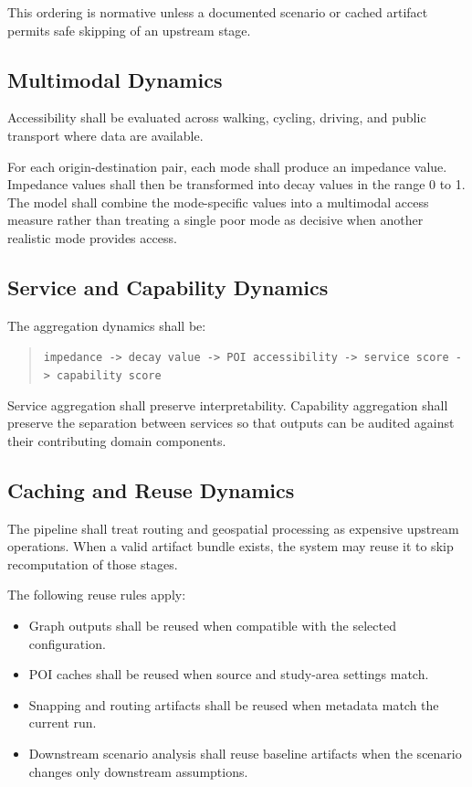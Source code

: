 \documentclass[11pt]{article}
\begin{document}
This ordering is normative unless a documented scenario or cached artifact permits safe skipping of an upstream stage.

\subsection*{Multimodal Dynamics}

Accessibility shall be evaluated across walking, cycling, driving, and public transport where data are available.

For each origin-destination pair, each mode shall produce an impedance value. Impedance values shall then be transformed into decay values in the range 0 to 1. The model shall combine the mode-specific values into a multimodal access measure rather than treating a single poor mode as decisive when another realistic mode provides access.

\subsection*{Service and Capability Dynamics}

The aggregation dynamics shall be:

\begin{quote}
\texttt{impedance -> decay value -> POI accessibility -> service score -> capability score}
\end{quote}

Service aggregation shall preserve interpretability. Capability aggregation shall preserve the separation between services so that outputs can be audited against their contributing domain components.

\subsection*{Caching and Reuse Dynamics}

The pipeline shall treat routing and geospatial processing as expensive upstream operations. When a valid artifact bundle exists, the system may reuse it to skip recomputation of those stages.

The following reuse rules apply:

\begin{itemize}
  \item Graph outputs shall be reused when compatible with the selected configuration.
  \item POI caches shall be reused when source and study-area settings match.
  \item Snapping and routing artifacts shall be reused when metadata match the current run.
  \item Downstream scenario analysis shall reuse baseline artifacts when the scenario changes only downstream assumptions.
\end{itemize}
\end{document}
